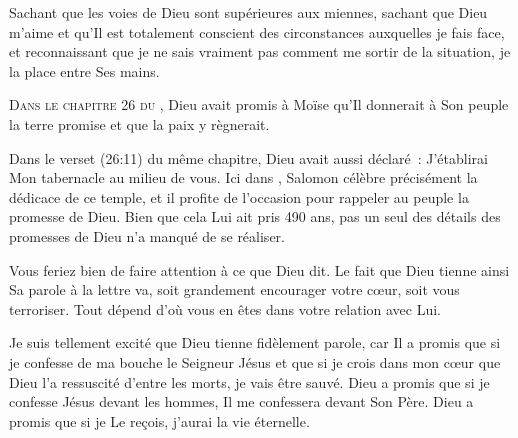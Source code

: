 Sachant que les voies de Dieu sont supérieures aux miennes,
 sachant que Dieu m'aime et qu'Il est totalement conscient des circonstances
 auxquelles je fais face, et reconnaissant que je ne sais vraiment pas comment
 me sortir de la situation, je la place entre Ses mains. 

\dvrule






\lettrine{D}{ans le chapitre 26 du },
 Dieu avait promis à Moïse qu'Il donnerait à Son peuple
 la terre promise et que la paix y règnerait.

Dans le verset (26:11) du même chapitre, Dieu avait aussi déclaré~:
 \og J'établirai Mon tabernacle au milieu de vous. \fg{}
 Ici dans , Salomon célèbre précisément
 la dédicace de ce temple, et il profite de l'occasion pour rappeler au peuple
 la promesse de Dieu.
 Bien que cela Lui ait pris 490 ans, pas un seul des détails des promesses
 de Dieu n'a manqué de se réaliser. 


Vous feriez bien de faire attention à ce que Dieu dit.
 Le fait que Dieu tienne ainsi Sa parole à la lettre va,
 soit grandement encourager votre c\oe{}ur, soit vous terroriser.
 Tout dépend d'où vous en êtes dans votre relation avec Lui. 

Je suis tellement excité que Dieu tienne fidèlement parole,
 car Il a promis que si je confesse de ma bouche le Seigneur Jésus
 et que si je crois dans mon c\oe{}ur que Dieu l'a ressuscité
 d'entre les morts, je vais être sauvé.
 Dieu a promis que si je confesse Jésus devant les hommes,
 Il me confessera devant Son Père.
 Dieu a promis que si je Le reçois, j'aurai la vie éternelle. 


\dvrule



